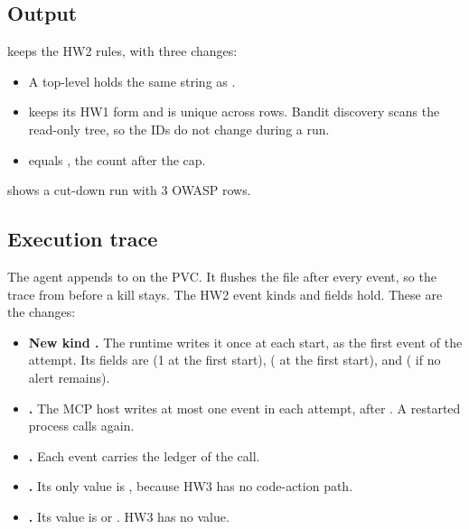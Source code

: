 \documentclass[9pt,letterpaper]{article}
\begin{document}
\subsection{Output}\label{sec:output}

 keeps the HW2 rules, with three changes:
\begin{itemize}
\item A top-level  holds the same string as .
\item {} keeps its HW1 form and is unique across rows. Bandit
  discovery scans the read-only  tree, so the IDs do not change
  during a run.
\item {} equals , the count after the cap.
\end{itemize}
 shows a cut-down run with 3 OWASP rows.

\subsection{Execution trace}\label{sec:trace}

The agent appends to  on the  PVC. It
flushes the file after every event, so the trace from before a kill stays. The
HW2 event kinds and fields hold. These are the changes:
\begin{itemize}
\item \textbf{New kind .} The runtime writes it once at each start,
  as the first event of the attempt. Its fields are  (1 at the
  first start),  ( at the first start), and
   ( if no alert remains).
\item \textbf{.} The MCP host writes at most one
   event in each attempt, after . A restarted
  process calls  again.
\item \textbf{.} Each  event carries the ledger
   of the call.
\item \textbf{.} Its only value is , because HW3 has no
  code-action path.
\item \textbf{.} Its value is  or
  . HW3 has no  value.
\end{itemize}
\end{document}
